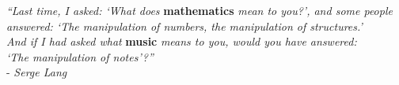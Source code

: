 
\blankpage
\vspace*{5\baselineskip}

\begin{flushright}
    \textit{``Last time, I asked: `What does}
    \textbf{mathematics}\textit{ mean to you?',
    and some people answered: `The manipulation of numbers, the manipulation of
    structures.' \\
    And if I had asked what }\textbf{music}
    \textit{means to you, would you have answered: \\
    `The manipulation of notes'?''}
    \\
    - \textit{Serge Lang} 
\end{flushright}